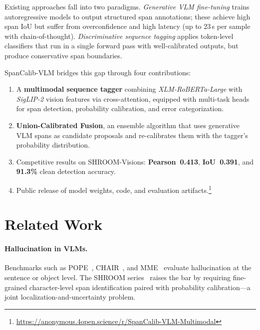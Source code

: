 \documentclass[11pt]{article}
\begin{document}
Existing approaches fall into two paradigms. \emph{Generative VLM fine-tuning} trains autoregressive models to output structured span annotations; these achieve high span IoU but suffer from overconfidence and high latency (up to 23\,s per sample with chain-of-thought). \emph{Discriminative sequence tagging} applies token-level classifiers that run in a single forward pass with well-calibrated outputs, but produce conservative span boundaries.

SpanCalib-VLM bridges this gap through four contributions:
\begin{enumerate}[noitemsep,leftmargin=*]
    \item A \textbf{multimodal sequence tagger} combining \textit{XLM-RoBERTa-Large} with \textit{SigLIP-2} vision features via cross-attention, equipped with multi-task heads for span detection, probability calibration, and error categorization.
    \item \textbf{Union-Calibrated Fusion}, an ensemble algorithm that uses generative VLM spans as candidate proposals and re-calibrates them with the tagger's probability distribution.
    \item Competitive results on SHROOM-Visions: \textbf{Pearson~0.413}, \textbf{IoU~0.391}, and \textbf{91.3\%} clean detection accuracy.
    \item Public release of model weights, code, and evaluation artifacts.\footnote{\scriptsize\url{https://anonymous.4open.science/r/SpanCalib-VLM-Multimodal}}
\end{enumerate}

\section{Related Work}

\paragraph{Hallucination in VLMs.}
Benchmarks such as POPE~\cite{li2023evaluating}, CHAIR~\cite{rohrbach2018object}, and MME~\cite{fu2023mme} evaluate hallucination at the sentence or object level. The SHROOM series~\cite{mickus2024shroom,vazquez2025mushroom} raises the bar by requiring fine-grained character-level span identification paired with probability calibration---a joint localization-and-uncertainty problem.
\end{document}
